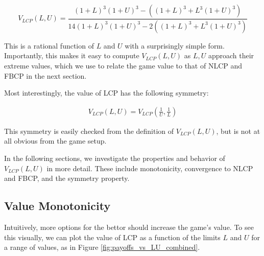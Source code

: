 \documentclass[a4paper,12pt]{article}
\theoremstyle{plain}
\theoremstyle{definition}
\begin{document}
\[
    V_{LCP}(L, U) = \frac{(1 + L)^3(1+U)^3 - ((1+L)^3+L^3(1 + U)^3)}{14(1 + L)^3(1+U)^3 - 2((1+L)^3+L^3(1 + U)^3)}
\]

This is a rational function of $L$ and $U$ with a surprisingly simple form.  Importantly, this makes it easy to compute $V_{LCP}(L, U)$ as $L, U$ approach their extreme values, which we use to relate the game value to that of NLCP and FBCP in the next section. 

Most interestingly, the value of LCP has the following symmetry:

\begin{align*}
    V_{LCP}(L, U) = V_{LCP}\left(\frac{1}{U}, \frac{1}{L}\right)
\end{align*}

This symmetry is easily checked from the definition of $V_{LCP}(L, U)$, but is not at all obvious from the game setup.

In the following sections, we investigate the properties and behavior of $V_{LCP}(L, U)$ in more detail. These include monotonicity, convergence to NLCP and FBCP, and the symmetry property.





\subsection{Value Monotonicity}

Intuitively, more options for the bettor should increase the game's value. To see this visually, we can plot the value of LCP as a function of the limits $L$ and $U$ for a range of values, as in Figure \ref{fig:payoffs_vs_LU_combined}.
\end{document}
